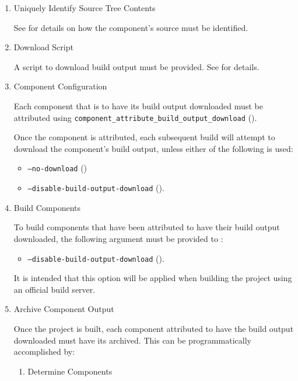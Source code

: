\begin{enumerate}
\item{Uniquely Identify Source Tree Contents}

  See  for details on how the
  component's source must be identified.

\item{Download Script}

  A script to download build output must be provided.  See
   for details.

\item{Component Configuration}

 Each component that is to have its build output downloaded must be
 attributed using
 \texttt{component\_attribute\_build\_output\_download}
 ().

 Once the component is attributed, each subsequent build will attempt
 to download the component's build output, unless either of the
 following is used:

 \begin{itemize}
 \item \texttt{--no-download} ()
 \item \texttt{--disable-build-output-download}
   ().
 \end{itemize}

\item{Build Components}

  To build components that have been attributed to have their build
  output downloaded, the following argument must be provided to
  \lmsbwcmd:

 \begin{itemize}
 \item \texttt{--disable-build-output-download}
   ().
 \end{itemize}

 It is intended that this option will be applied when building the
 project using an official build server.

\item{Archive Component Output}

  Once the project is built, each component attributed to have the
  build output downloaded must have its \destdir archived.  This can
  be programmatically accomplished by:

  \begin{enumerate}
    \item{Determine Components}


\end{enumerate}
\end{enumerate}
